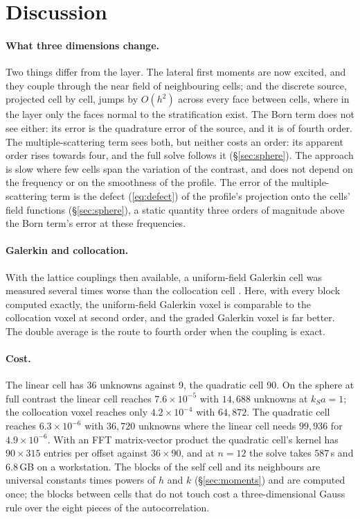 \documentclass[11pt,a4paper]{article}
\begin{document}
\section{Discussion}\label{sec:discussion}

\paragraph{What three dimensions change.} Two things differ from the layer. The lateral first moments are
now excited, and they couple through the near field of neighbouring cells; and the discrete source,
projected cell by cell, jumps by $O(h^2)$ across every face between cells, where in the layer only the
faces normal to the stratification exist. The Born term does not see either: its error is the quadrature
error of the source, and it is of fourth order. The multiple-scattering term sees both, but neither costs
an order: its apparent order rises towards four, and the full solve follows it (\S\ref{sec:sphere}). The
approach is slow where few cells span the variation of the contrast, and does not depend on the frequency
or on the smoothness of the profile. The error of the multiple-scattering term is the defect
(\ref{eq:defect}) of the profile's projection onto the cells' field functions (\S\ref{sec:sphere}), a
static quantity three orders of magnitude above the Born term's error at these frequencies.

\paragraph{Galerkin and collocation.} With the lattice couplings then available, a uniform-field Galerkin
cell was measured several times worse than the collocation cell \citep{NestorError2026}. Here, with every
block computed exactly, the uniform-field Galerkin voxel is comparable to the collocation voxel at second
order, and the graded Galerkin voxel is far better. The double average is the route to fourth order when
the coupling is exact.

\paragraph{Cost.} The linear cell has 36 unknowns against 9, the quadratic cell 90. On the sphere at full
contrast the linear cell reaches $7.6\times10^{-5}$ with $14{,}688$ unknowns at $k_Sa=1$; the collocation
voxel reaches only $4.2\times10^{-4}$ with $64{,}872$. The quadratic cell reaches $6.3\times10^{-6}$ with
$36{,}720$ unknowns where the linear cell needs $99{,}936$ for $4.9\times10^{-6}$. With an FFT
matrix-vector product the quadratic cell's kernel has $90\times315$ entries per offset against
$36\times90$, and at $n=12$ the solve takes $587$\,s and $6.8$\,GB on a workstation. The blocks of the
self cell and its neighbours are universal constants times powers of $h$ and $k$ (\S\ref{sec:moments})
and are computed once; the blocks between cells that do not touch cost a three-dimensional Gauss rule
over the eight pieces of the autocorrelation.
\end{document}

